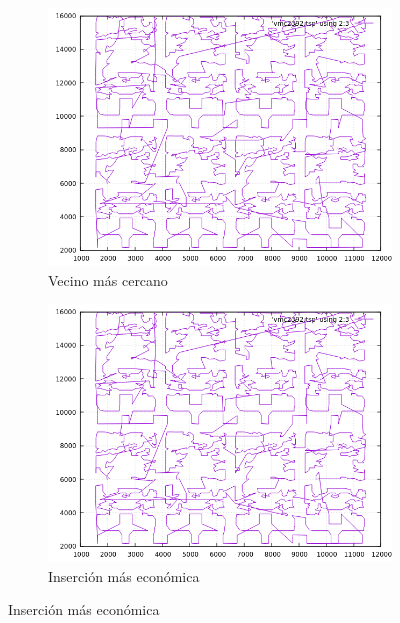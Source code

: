 \documentclass[12pt,spanish]{article}
\begin{document}
\begin{figure}[H]
\centering
\begin{subfigure}[b]{0.36\textwidth}
\includegraphics[width=\textwidth]{pr2392_vmc.png}
\caption{Vecino más cercano}
\end{subfigure}
\quad
\begin{subfigure}[b]{0.36\textwidth}
\includegraphics[width=\textwidth]{pr2392_vmc.png}
\caption{Inserción más económica}
\end{subfigure}

\vspace{1cm}


\end{figure}
\end{document}
